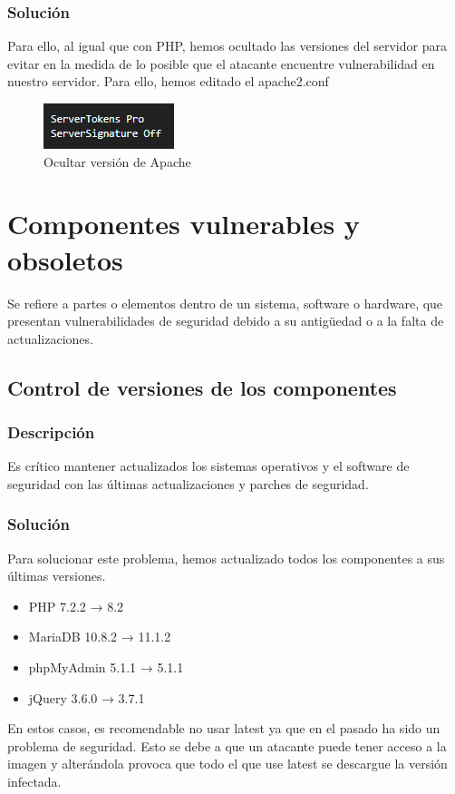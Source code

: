 \documentclass{report}
\begin{document}
                \subsubsection{Solución}
                    Para ello, al igual que con PHP, hemos ocultado las versiones del servidor para evitar en la medida de lo posible que el atacante encuentre vulnerabilidad en nuestro servidor. Para ello, hemos editado el apache2.conf
                    \begin{figure}[H]
                        \centering
                        \includegraphics[width=\textwidth]{./img/vulnerabilidades/3.5/15.1.png}
                        \caption{Ocultar versión de Apache}
                    \end{figure}
            \clearpage
        \section{Componentes vulnerables y obsoletos}
            Se refiere a partes o elementos dentro de un sistema, software o hardware, que presentan vulnerabilidades de seguridad debido a su antigüedad o a la falta de actualizaciones.
            \subsection{Control de versiones de los componentes}
                \subsubsection{Descripción}
                    Es crítico mantener actualizados los sistemas operativos y el software de seguridad con las últimas actualizaciones y parches de seguridad.
                \subsubsection{Solución}
                    Para solucionar este problema, hemos actualizado todos los componentes a sus últimas versiones.
                    \begin{itemize}
                        \item PHP 7.2.2 → 8.2
                        \item MariaDB 10.8.2 → 11.1.2
                        \item phpMyAdmin 5.1.1 → 5.1.1
                        \item jQuery 3.6.0 → 3.7.1
                    \end{itemize}
                    En estos casos, es recomendable no usar latest ya que en el pasado ha sido un problema de seguridad. Esto se debe a que un atacante puede tener acceso a la imagen y alterándola provoca que todo el que use latest se descargue la versión infectada.
            \clearpage
\end{document}
